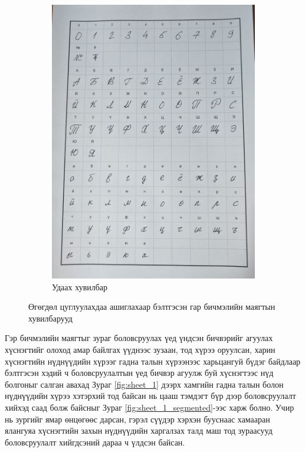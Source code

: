 \begin{figure}[H]
\begin{subfigure}{0.52\textwidth}
		\includegraphics[width=0.9\linewidth]{images/sheet_2}
		\caption{Удаах хувилбар}
		\label{fig:sheet_2}
	\end{subfigure}
	\caption{Өгөгдөл цуглуулахдаа ашиглахаар бэлтгэсэн гар бичмэлийн маягтын хувилбарууд}
	\label{fig:sheets}
\end{figure}


Гэр бичмэлийн маягтыг зураг боловсруулах үед үндсэн бичвэрийг агуулах хүснэгтийг олоход амар байлгах үүднээс зузаан, тод хүрээ оруулсан, харин хүснэгтийн нүднүүдийн хүрээг гадна талын хүрээнээс харьцангуй бүдэг байдлаар бэлтгэсэн хэдий ч боловсруулалтын үед бичвэр агуулж буй хүснэгтээс нүд болгоныг салган авахад Зураг \ref{fig:sheet_1} дээрх хамгийн гадна талын болон нүднүүдийн хүрээ хэтэрхий тод байсан нь цааш тэмдэгт бүр дээр боловсруулалт хийхэд саад болж байсныг Зураг \ref{fig:sheet_1_segmented}-ээс харж болно. Учир нь зургийг ямар өнцөгөөс дарсан, гэрэл сүүдэр хэрхэн бууснаас хамааран ялангуяа хүснэгтийн захын нүднүүдийн харгалзах талд маш тод зураасууд боловсруулалт хийгдсэний дараа ч үлдсэн байсан.


